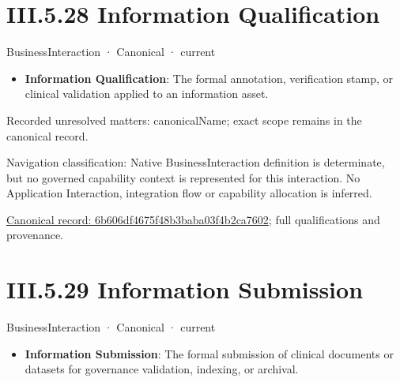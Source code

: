 \section*{III.5.28 Information Qualification}
\label{navigation:III.5.28}

\label{element:6b606df4675f48b3baba03f4b2ca7602}
{\small BusinessInteraction · Canonical · current}\par

\begin{itemize}


\item \textbf{Information Qualification}: The formal annotation, verification stamp, or clinical validation applied to an information asset.

\end{itemize}

{\small Recorded unresolved matters: canonicalName; exact scope remains in the canonical record.}\par
{\small Navigation classification: Native BusinessInteraction definition is determinate, but no governed capability context is represented for this interaction. No Application Interaction, integration flow or capability allocation is inferred.}\par
{\footnotesize \href{../../../../continuum/business/business-interaction/6b606df4675f48b3baba03f4b2ca7602.md}{Canonical record: 6b606df4675f48b3baba03f4b2ca7602}; full qualifications and provenance.}\par
\section*{III.5.29 Information Submission}
\label{navigation:III.5.29}

\label{element:d3186ad3c8a74e92a80cb4c1f8f32fb6}
{\small BusinessInteraction · Canonical · current}\par

\begin{itemize}


\item \textbf{Information Submission}: The formal submission of clinical documents or datasets for governance validation, indexing, or archival.

\end{itemize}

